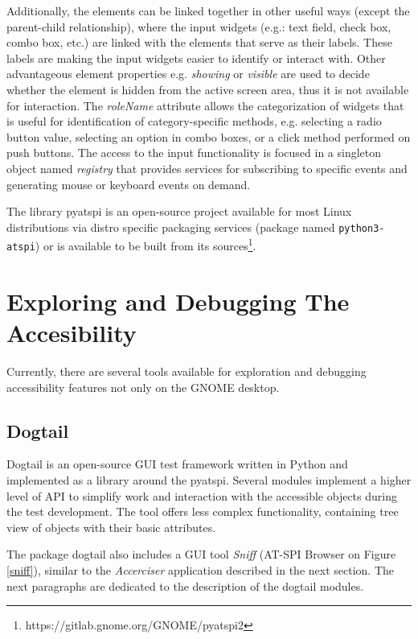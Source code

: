 Additionally, the elements can be linked together in other useful ways (except the parent-child relationship), where the input widgets (e.g.: text field, check box, combo box, etc.) are linked with the elements that serve as their labels. These labels are making the input widgets easier to identify or interact with. Other advantageous element properties e.g. \textit{showing} or \textit{visible} are used to decide whether the element is hidden from the active screen area, thus it is not available for interaction. The \textit{roleName} attribute allows the categorization of widgets that is useful for identification of category-specific methods, e.g. selecting a radio button value, selecting an option in combo boxes, or a click method performed on push buttons. The access to the input functionality is focused in a singleton object named \textit{registry} that provides services for subscribing to specific events and generating  mouse or keyboard events on demand.

The library pyatspi is an open-source project available for most Linux distributions via distro specific packaging services (package named \texttt{python3-atspi}) or is available to be built from its sources\footnote{https://gitlab.gnome.org/GNOME/pyatspi2}.

\section{Exploring and Debugging The Accesibility}
Currently, there are several tools available for exploration and debugging accessibility features not only on the GNOME desktop.

\subsection{Dogtail}\label{sniff_accerciser}
Dogtail is an open-source GUI test framework written in Python and implemented as a library around the pyatspi. Several modules implement a higher level of API to simplify work and interaction with the accessible objects during the test development. The tool offers less complex functionality, containing tree view of objects with their basic attributes\cite{dogtail_doc}. 

The package dogtail also includes a GUI tool \textit{Sniff} (AT-SPI Browser on Figure \ref{sniff}), similar to the \textit{Accerciser} application described in the next section. The next paragraphs are dedicated to the description of the dogtail modules.

